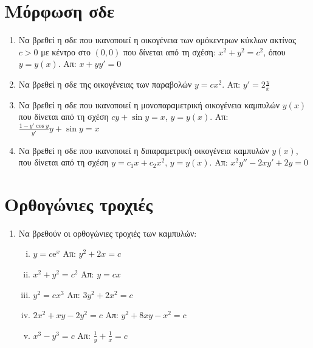 



\pagestyle{askhseis}




\begin{center}
  \minibox{\large\bfseries \textcolor{Col1}{Εφαρμογές των συνήθων διαφορικών εξισώσεων}}
\end{center}

\vspace{\baselineskip}

\section*{Μόρφωση σδε}

\begin{enumerate}
  \item Να βρεθεί η σδε που ικανοποιεί η οικογένεια των ομόκεντρων κύκλων ακτίνας $c>0$ 
    με κέντρο στο  $ (0,0) $ που δίνεται από τη σχέση:  $ x^{2} + y^{2} = c^{2} $,  
    όπου  $ y=y(x) $.
    \hfill Απ: $ x+yy'=0 $ 

  \item Να βρεθεί η σδε της οικογένειας των παραβολών $ y=cx^{2} $.
    \hfill Απ: $ y'=2 \frac{y}{x} $ 

  \item  Να βρεθεί η σδε που ικανοποιεί η μονοπαραμετρική οικογένεια καμπυλών  $ y(x) $ 
    που δίνεται από τη σχέση  $ cy+ \sin{y} = x $, $ y=y(x) $.
    \hfill Απ: $ \frac{1-y' \cos{y}}{y'} y + \sin{y} = x $ 

  \item  Να βρεθεί η σδε που ικανοποιεί η διπαραμετρική οικογένεια καμπυλών $ y(x) $, 
    που δίνεται από τη σχέση  $ y = c_{1}x + c_{2}x^{2} $, $y=y(x)$.
    \hfill Απ: $ x^{2}y''-2xy'+2y=0 $ 
\end{enumerate}

\section*{Ορθογώνιες τροχιές}

\begin{enumerate}
  \item Να βρεθούν οι ορθογώνιες τροχιές των καμπυλών:

    \begin{enumerate}[i)]
      \item $ y=c \mathrm{e}^{x} $ \hfill Απ: $ y^{2}+2x=c $ %
      \item $ x^{2}+y^{2}=c^{2} $ \hfill Απ: $ y=cx $  %
      \item $ y^{2}=cx^{3} $ \hfill Απ: $ 3y^{2}+2x^{2}=c $ 
      \item $ 2x^{2}+xy-2y^{2}=c $ \hfill Απ: $ y^{2}+8xy-x^{2}=c $ 
      \item $ x^{3}-y^{3}=c $ \hfill Απ: $ \frac{1}{y} + \frac{1}{x} =c $ 
    \end{enumerate}
\end{enumerate}


